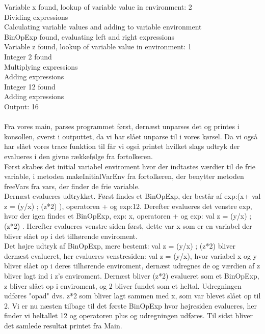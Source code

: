 \documentclass[a1paper, 10pt]{article}
\theoremstyle{remark}
\begin{document}
Variable x found, lookup of variable value in environment: 2\\
Dividing expressions\\
Calculating variable values and adding to variable environment\\
BinOpExp found, evaluating left and right expressions\\
Variable z found, lookup of variable value in environment: 1\\
Integer 2 found\\
Multiplying expressions\\
Adding expressions\\
Integer 12 found\\
Adding expressions\\
Output: 16\\
\\
Fra vores main, parses programmet først, dernæst unparses det og printes i konsollen, øverst i outputtet, da vi har slået unparse til i vores kørsel. Da vi også har slået vores trace funktion til får vi også printet hvilket slags udtryk der evalueres i den givne rækkefølge fra fortolkeren.\\ 
Først skabes det initial variabel enviroment hvor der indtastes værdier til de frie variable, i metoden makeInitialVarEnv fra fortolkeren, der benytter metoden freeVars fra vars, der finder de frie variable.\\
Dernæst evalueres udtrykket. Først findes et BinOpExp, der består af exp:(x+{ val z = (y/x) ; (z*2) }), operatoren + og exp:12. Derefter evalueres det venstre exp, hvor der igen findes et BinOpExp, exp: x, operatoren + og exp: { val z = (y/x) ; (z*2) }. Herefter evalueres venstre siden først, dette var x som er en variabel der bliver slået op i det tilhørende enviroment. \\ 
Det højre udtryk af BinOpExp, mere bestemt: { val z = (y/x) ; (z*2) } bliver dernæst evalueret, her evalueres venstresiden: val z = (y/x), hvor variabel x og y bliver slået op i deres tilhørende enviroment, dernæst udregnes de og værdien af z bliver lagt ind i z's enviroment. Dernæst bliver (z*2) evalueret som et BinOpExp, z bliver slået op i enviroment, og 2 bliver fundet som et heltal. Udregningen udføres "opad" dvs. z*2 som bliver lagt sammen med x, som var blevet slået op til 2. Vi er nu næsten tilbage til det første BinOpExp hvor højresiden evalueres, her finder vi heltallet 12 og operatoren plus og udregningen udføres. Til sidst bliver det samlede resultat printet fra Main.
\end{document}
